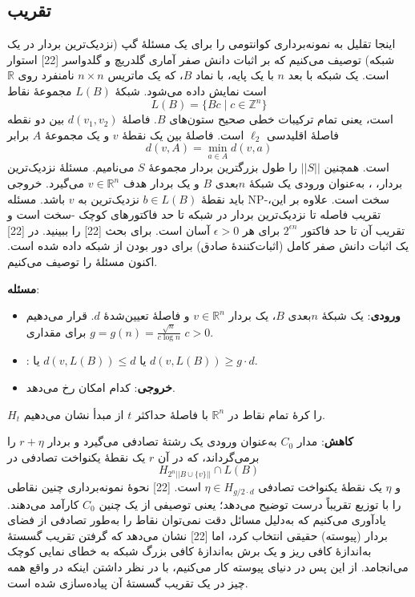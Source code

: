 \subsection{ تقریب }
اینجا تقلیل به نمونه‌برداری کوانتومی را برای یک مسئلهٔ گپ  (نزدیک‌ترین بردار در یک شبکه) توصیف می‌کنیم که بر اثبات دانش صفر آماری گلدریچ و گلدواسر [22] استوار است. یک شبکه با بعد $n$ با یک پایه، با نماد $B$، که یک ماتریس $n \times n$ نامنفرد روی $\mathbb{R}$ است نمایش داده می‌شود. شبکهٔ $L(B)$ مجموعهٔ نقاط 
$$L(B) = \{ Bc \mid c \in \mathbb{Z}^n \}$$
است، یعنی تمام ترکیبات خطی صحیح ستون‌های $B$. فاصلهٔ $d(v_1, v_2)$ بین دو نقطه فاصلهٔ اقلیدسی $\ell_2$ است. فاصلهٔ بین یک نقطهٔ $v$ و یک مجموعهٔ $A$ برابر 
$$d(v, A) = \min_{a \in A} d(v, a)$$
است. همچنین $||S||$ را طول بزرگترین بردار مجموعهٔ $S$ می‌نامیم. مسئلهٔ نزدیک‌ترین بردار، ، به‌عنوان ورودی یک شبکهٔ $n$بعدی $B$ و یک بردار هدف $v \in \mathbb{R}^n$ می‌گیرد. خروجی باید نقطهٔ $b \in L(B)$ نزدیک‌ترین به $v$ باشد. مسئله NP-سخت است. علاوه بر این، تقریب فاصله تا نزدیک‌ترین بردار در شبکه تا حد فاکتورهای کوچک -سخت است و تقریب آن تا حد فاکتور $2^{\epsilon n}$ برای هر $\epsilon > 0$ آسان است. برای بحث [22] را ببینید. در [22] یک اثبات دانش صفر کامل (اثبات‌کنندهٔ صادق) برای دور بودن از شبکه داده شده است. اکنون مسئلهٔ  را توصیف می‌کنیم.

\textbf{مسئله}:
\begin{itemize}
	\item 
	\textbf{ورودی}: یک شبکهٔ $n$بعدی $B$، یک بردار $v \in \mathbb{R}^n$ و فاصلهٔ تعیین‌شدهٔ $d$. قرار می‌دهیم $g = g(n) = \frac{\sqrt{n}}{c \log n}$ برای مقداری $c > 0$. 
	\item
	\textbf{}: یا $d(v, L(B)) \le d$ یا $d(v, L(B)) \ge g \cdot d$.
	\item
	 \textbf{خروجی}: کدام امکان رخ می‌دهد.
\end{itemize}

$H_t$ را کرهٔ تمام نقاط در $\mathbb{R}^n$ با فاصلهٔ حداکثر $t$ از مبدأ نشان می‌دهیم.

\textbf{کاهش}:
 مدار $C_0$ به‌عنوان ورودی یک رشتهٔ تصادفی می‌گیرد و بردار $r + \eta$ را برمی‌گرداند، که در آن $r$ یک نقطهٔ یکنواخت تصادفی در 
 $$H_{2^n ||B \cup \{v\}||} \cap L(B)$$
  و $\eta$ یک نقطهٔ یکنواخت تصادفی $\eta \in H_{g/2 \cdot d}$ است. [22] نحوهٔ نمونه‌برداری چنین نقاطی را با توزیع تقریباً درست توضیح می‌دهد؛ یعنی توصیفی از یک چنین $C_0$ کارآمد می‌دهند. یادآوری می‌کنیم که به‌دلیل مسائل دقت نمی‌توان نقاط را به‌طور تصادفی از فضای بردار (پیوسته) حقیقی انتخاب کرد، اما [22] نشان می‌دهد که گرفتن تقریب گسستهٔ به‌اندازهٔ کافی ریز و یک برش به‌اندازهٔ کافی بزرگ شبکه به خطای نمایی کوچک می‌انجامد. از این پس در دنیای پیوسته کار می‌کنیم، با در نظر داشتن اینکه در واقع همه چیز در یک تقریب گسستهٔ آن پیاده‌سازی شده است.

